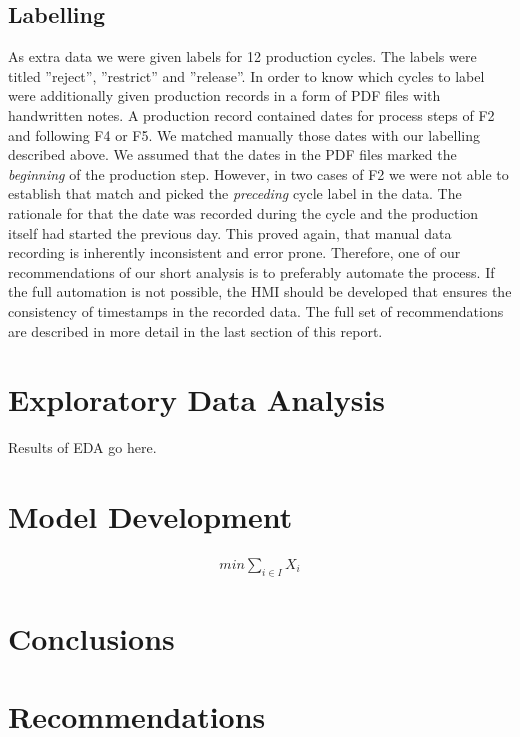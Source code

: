\documentclass{article}
\begin{document}
\subsection{Labelling}
As extra data we were given labels for 12 production cycles. The labels were titled ''reject'', ''restrict'' and ''release''. In order to know which cycles to label were additionally given production records in a form of PDF files with handwritten notes. A production record contained dates for process steps of F2 and following F4 or F5. We matched manually those dates with our labelling described above. We assumed that the dates in the PDF files marked the \emph{beginning} of the production step. However, in two cases of F2 we were not able to establish that match and picked the \emph{preceding} cycle label in the data. The rationale for that the date was recorded during the cycle and the production itself had started the previous day. This proved again, that manual data recording is inherently inconsistent and error prone. Therefore, one of our recommendations of our short analysis is to preferably automate the process. If the full automation is not possible, the HMI should be developed that ensures the consistency of timestamps in the recorded data. The full set of recommendations are described in more detail in the last section of this report.

\section{Exploratory Data Analysis}
Results of EDA go here. 

\section{Model Development}
\begin{align}
    min \sum_{i \in I}{X_i}    
\end{align}

\section{Conclusions}

\section{Recommendations}

\listoffigures
\end{document}

